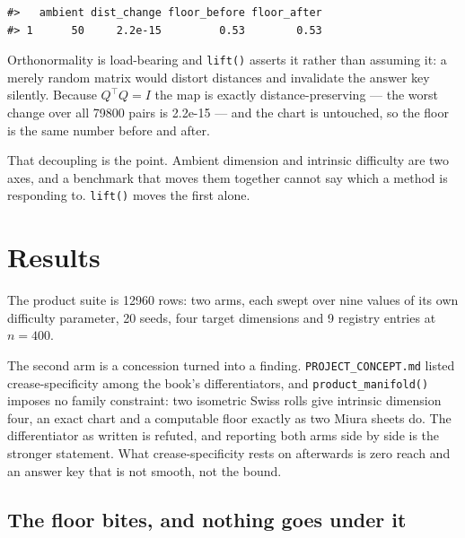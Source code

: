 \documentclass[
  british,
  a4paper,
]{book}
\begin{document}
\begin{verbatim}
#>   ambient dist_change floor_before floor_after
#> 1      50     2.2e-15         0.53        0.53
\end{verbatim}

Orthonormality is load-bearing and \texttt{lift()} asserts it rather than assuming it:
a merely random matrix would distort distances and invalidate the answer key
silently. Because \(Q^\top Q = I\) the map is exactly distance-preserving --- the
worst change over all
79800 pairs is
2.2e-15 --- and the
chart is untouched, so the floor is the same number before and after.

That decoupling is the point. Ambient dimension and intrinsic difficulty are two
axes, and a benchmark that moves them together cannot say which a method is
responding to. \texttt{lift()} moves the first alone.

\section{Results}\label{bench-results}

The product suite is 12960 rows: two arms, each swept over nine values
of its own difficulty parameter, 20 seeds, four target
dimensions and 9 registry entries at
\(n = 400\).

The second arm is a concession turned into a finding. \texttt{PROJECT\_CONCEPT.md}
listed crease-specificity among the book's differentiators, and
\texttt{product\_manifold()} imposes no family constraint: two isometric Swiss rolls
give intrinsic dimension four, an exact chart and a computable floor exactly as
two Miura sheets do. The differentiator as written is refuted, and reporting
both arms side by side is the stronger statement. What crease-specificity rests
on afterwards is zero reach \citep{federer1959curvature, niyogi2008homology} and an
answer key that is not smooth, not the bound.

\subsection{The floor bites, and nothing goes under it}\label{the-floor-bites-and-nothing-goes-under-it}
\end{document}
